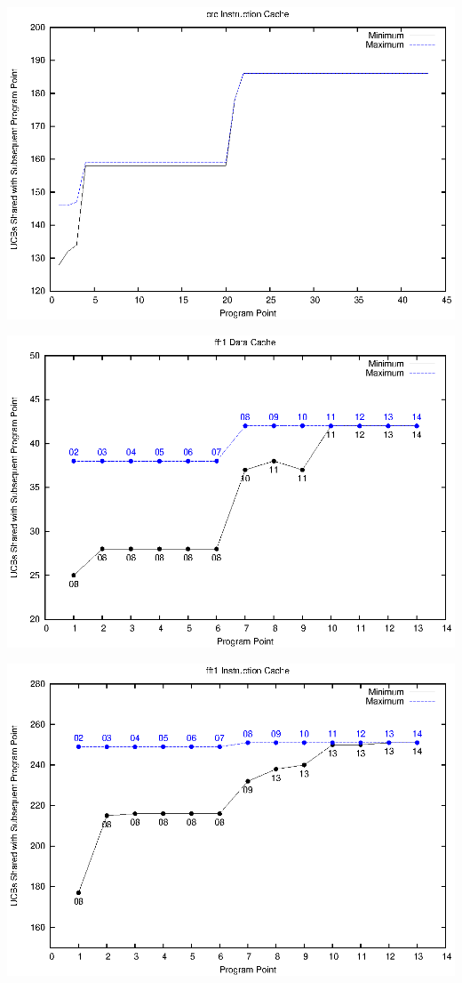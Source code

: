 \begin{center}
  \includegraphics[width=\linewidth]{eps/crc-icache.eps}
\end{center}

\begin{center}
  \includegraphics[width=\linewidth]{eps/fft1-dcache.eps}
\end{center}

\begin{center}
  \includegraphics[width=\linewidth]{eps/fft1-icache.eps}
\end{center}

